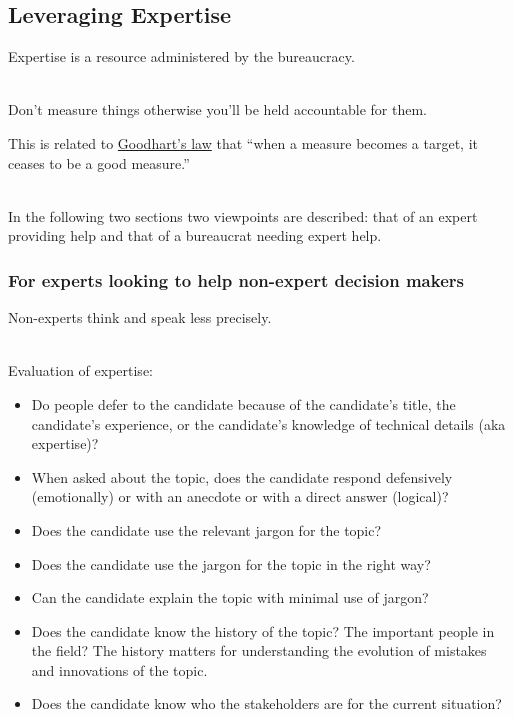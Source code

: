 \subsection{Leveraging Expertise\label{sec:expertise}}

Expertise is a resource administered by the bureaucracy.

\ \\

Don't measure things otherwise you'll be held accountable for them.

This is related to \href{https://en.wikipedia.org/wiki/Goodhart\%27s_law}{Goodhart's law} that ``when a measure becomes a target, it ceases to be a good measure.''

\ \\

In the following two sections two viewpoints are described: that of an expert providing help and that of a bureaucrat needing expert help. 

\subsubsection{For experts looking to help non-expert decision makers}

Non-experts think and speak less precisely.

\ \\

Evaluation of expertise:
\begin{itemize}
    \item Do people defer to the candidate because of the candidate's title, the candidate's experience, or the candidate's knowledge of technical details (aka expertise)?
    \item When asked about the topic, does the candidate respond defensively (emotionally) or with an anecdote or with a direct answer (logical)?
    \item Does the candidate use the relevant jargon for the topic?
    \item Does the candidate use the jargon for the topic in the right way?
    \item Can the candidate explain the topic with minimal use of jargon?
    \item Does the candidate know the history of the topic? The important people in the field? The history matters for understanding the evolution of mistakes and innovations of the topic.
    \item Does the candidate know who the stakeholders are for the current situation? 
\end{itemize}


